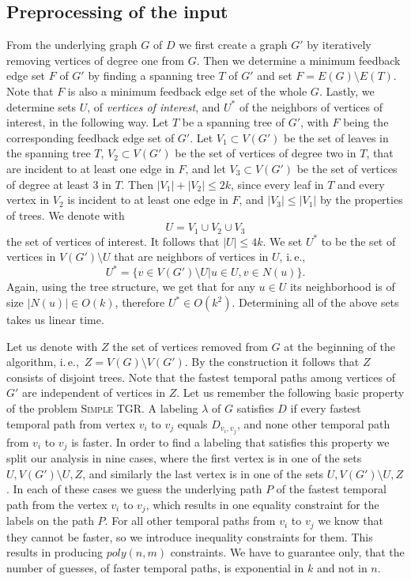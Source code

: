 \documentclass[11pt,a4paper]{article}
\theoremstyle{remark}
\theoremstyle{definition}
\newcommand{\ie}{i.\,e.,\ }
\newcommand{\deltaExact}{\textsc{Simple TGR}}
\begin{document}
\subsection{Preprocessing of the input}
From the underlying graph $G$ of $D$ we first create a graph $G'$ by
iteratively removing vertices of degree one from $G$.
Then we determine a minimum feedback edge set $F$ of $G'$ by finding a spanning tree $T$ of $G'$ and set $F = E(G) \setminus E(T)$. 
Note that $F$ is also a minimum feedback edge set of the whole $G$.
Lastly, we determine sets $U$, of \emph{vertices of interest}, and $U^*$ of the neighbors of vertices of interest, in the following way.
Let $T$ be a spanning tree of $G'$, with $F$ being the corresponding feedback edge set of $G'$.
Let $V_1 \subset V(G')$ be the set of leaves in the spanning tree $T$, $V_2 \subset V(G')$ be the set of vertices of degree two in $T$, that are incident to at least one edge in $F$, 
and let $V_3 \subset V(G')$ be the set of vertices of degree at least $3$ in $T$. 
Then $|V_1| + |V_2| \leq 2k$, since every leaf in $T$ and every vertex in $V_2$ is incident to at least one edge in $F$,
and $|V_3| \leq |V_1|$ by the properties of trees.
We denote with 
$$U = V_1 \cup V_2 \cup V_3$$
the set of vertices of interest. It follows that $|U| \leq 4k$.
We set $U^*$ to be the set of vertices in $V(G') \setminus U$ that are neighbors of vertices in $U$, \ie 
$$U^* = \{v \in V(G') \setminus U | u \in U, v \in N(u)\}.$$
Again, using the tree structure, we get that for any $u \in U$ its neighborhood is of size $|N(u)| \in O(k)$, therefore $U^* \in O(k^2)$.
Determining all of the above sets takes us linear time.

Let us denote with $Z$ the set of vertices removed from $G$ at the beginning of the algorithm, \ie $Z = V(G) \setminus V(G')$.
By the construction it follows that $Z$ consists of disjoint trees. %
Note that the fastest temporal paths among vertices of $G'$ are independent of vertices in $Z$.
Let us remember the following basic property of the problem \deltaExact.
A labeling $\lambda$ of $G$ satisfies $D$ if every fastest temporal path from vertex $v_i$ to $v_j$ equals $D_{v_i, v_j}$,
and none other temporal path from $v_i$ to $v_j$ is faster.
In order to find a labeling that satisfies this property we split our analysis in nine cases,
where the first vertex is in one of the sets $U,V(G') \setminus U, Z$,
and similarly the last vertex is in one of the sets $U,V(G') \setminus U, Z$.
In each of these cases we guess the underlying path $P$ of the fastest temporal path from the vertex $v_i$ to $v_j$, 
which results in one equality constraint for the labels on the path $P$. 
For all other temporal paths from $v_i$ to $v_j$ we know that they cannot be faster, so we introduce inequality constraints for them.
This results in producing $poly(n,m)$ constraints. We have to guarantee only, that the number of guesses, of faster temporal paths, is exponential in $k$ and not in $n$.
\end{document}
